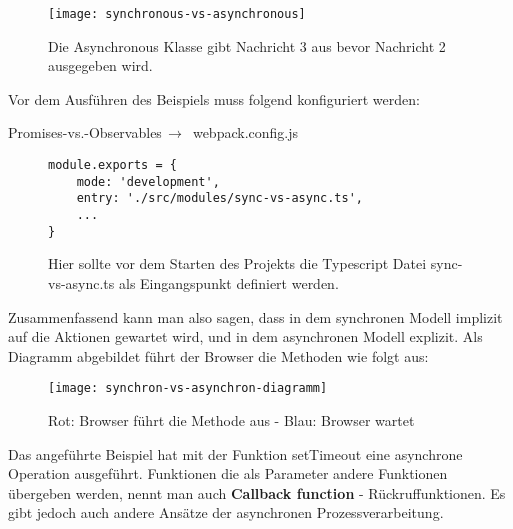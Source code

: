 \begin{figure}[H]
\centering
\texttt{[image: synchronous-vs-asynchronous]}
\caption{Die Asynchronous Klasse gibt Nachricht 3 aus bevor Nachricht 2 ausgegeben wird.}
\end{figure}

\noindent
Vor dem Ausführen des Beispiels muss folgend konfiguriert werden:

\begin{center}
    Promises-vs.-Observables$\,\to\,$ webpack.config.js
\end{center}

\begin{figure}[H]
\begin{lstlisting}
module.exports = {
    mode: 'development',
    entry: './src/modules/sync-vs-async.ts',
    ...
}
\end{lstlisting}
\caption{Hier sollte vor dem Starten des Projekts die Typescript Datei sync-vs-async.ts als Eingangspunkt definiert werden.}
\end{figure}

\noindent
Zusammenfassend kann man also sagen, dass in dem synchronen Modell implizit auf die Aktionen gewartet wird, und in dem asynchronen Modell explizit. Als Diagramm abgebildet führt der Browser die Methoden wie folgt aus:

\begin{center}
\begin{figure}[H]
\texttt{[image: synchron-vs-asynchron-diagramm]}
\caption{Rot: Browser führt die Methode aus - Blau: Browser wartet}
\end{figure}
\end{center}

\noindent
Das angeführte Beispiel hat mit der Funktion setTimeout eine asynchrone Operation ausgeführt. Funktionen die als Parameter andere Funktionen übergeben werden, nennt man auch \textbf{Callback function} - Rückruffunktionen. Es gibt jedoch auch andere Ansätze der asynchronen Prozessverarbeitung.





